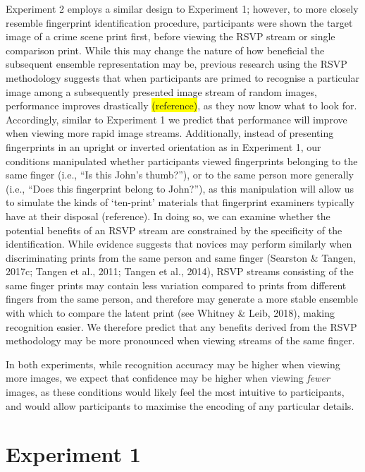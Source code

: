 \documentclass[
  english,
  man]{apa6}
\begin{document}
Experiment 2 employs a similar design to Experiment 1; however, to more closely resemble fingerprint identification procedure, participants were shown the target image of a crime scene print first, before viewing the RSVP stream or single comparison print. While this may change the nature of how beneficial the subsequent ensemble representation may be, previous research using the RSVP methodology suggests that when participants are primed to recognise a particular image among a subsequently presented image stream of random images, performance improves drastically \colorbox{yellow}{(reference)}, as they now know what to look for. Accordingly, similar to Experiment 1 we predict that performance will improve when viewing more rapid image streams. Additionally, instead of presenting fingerprints in an upright or inverted orientation as in Experiment 1, our conditions manipulated whether participants viewed fingerprints belonging to the same finger (i.e., ``Is this John's thumb?''), or to the same person more generally (i.e., ``Does this fingerprint belong to John?''), as this manipulation will allow us to simulate the kinds of `ten-print' materials that fingerprint examiners typically have at their disposal (reference). In doing so, we can examine whether the potential benefits of an RSVP stream are constrained by the specificity of the identification. While evidence suggests that novices may perform similarly when discriminating prints from the same person and same finger (Searston \& Tangen, 2017c; Tangen et al., 2011; Tangen et al., 2014), RSVP streams consisting of the same finger prints may contain less variation compared to prints from different fingers from the same person, and therefore may generate a more stable ensemble with which to compare the latent print (see Whitney \& Leib, 2018), making recognition easier. We therefore predict that any benefits derived from the RSVP methodology may be more pronounced when viewing streams of the same finger.

In both experiments, while recognition accuracy may be higher when viewing more images, we expect that confidence may be higher when viewing \emph{fewer} images, as these conditions would likely feel the most intuitive to participants, and would allow participants to maximise the encoding of any particular details.

\hypertarget{experiment-1}{%
\section{Experiment 1}\label{experiment-1}}
\end{document}
